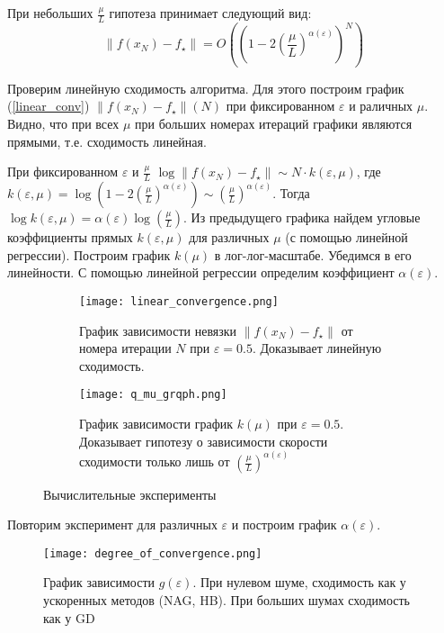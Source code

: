 \documentclass{article}
\begin{document}
При небольших $\frac{\mu}{L}$ гипотеза принимает следующий вид:
\begin{equation}\label{NoisyGFOMconverge}
   \|f(x_N) - f_{\star}\| = O\left(\left(1 - 2\left(\frac{\mu}{L}\right)^{\alpha(\varepsilon)}\right)^N\right) 
\end{equation}

Проверим линейную сходимость алгоритма. Для этого построим график (\ref{linear_conv}) $\|f(x_N) - f_{\star}\|(N)$ при фиксированном $\varepsilon$ и раличных $\mu$. Видно, что при всех $\mu$ при больших номерах итераций графики являются прямыми, т.е. сходимость линейная.

При фиксированном $\varepsilon$ и $\frac{\mu}{L}$ $\log{\|f(x_N) - f_{\star}\| \sim N \cdot k(\varepsilon, \mu)}$, где $k(\varepsilon, \mu) = \log{\left(1 - 2\left(\frac{\mu}{L}\right)^{\alpha(\varepsilon)}\right)}\sim \left(\frac{\mu}{L}\right)^{\alpha(\varepsilon)}$.
Тогда $\log{k(\varepsilon, \mu)} = \alpha(\varepsilon) \log{\left(\frac{\mu}{L}\right)}$. Из предыдущего графика найдем угловые коэффициенты прямых $k(\varepsilon, \mu)$ для различных $\mu$ (с помощью линейной регрессии). Построим график $k(\mu)$ в лог-лог-масштабе. Убедимся в его линейности. С помощью линейной регрессии определим коэффициент $\alpha(\varepsilon)$. 
\begin{figure}[htp]
     \centering
     \begin{subfigure}[b]{0.45\textwidth}
         \centering
         \texttt{[image: linear\_convergence.png]}
         \caption{График зависимости невязки $\|f(x_N) - f_{\star}\|$ от номера итерации $N$ при $\varepsilon = 0.5$. Доказывает линейную сходимость.}
         \label{fig:linear_conv}
     \end{subfigure}
     \hfill
     \begin{subfigure}[b]{0.45\textwidth}
         \centering
         \texttt{[image: q\_mu\_grqph.png]}
         \caption{График зависимости график $k(\mu)$ при $\varepsilon = 0.5$. Доказывает гипотезу о зависимости скорости сходимости только лишь от $\left(\frac{\mu}{L}\right)^{\alpha(\varepsilon)}$}
         \label{fig:three sin x}
     \end{subfigure}
     \hfill
        \caption{Вычислительные эксперименты}
        \label{fig:two graphs}
\end{figure}


Повторим эксперимент для различных $\varepsilon$ и построим график $\alpha(\varepsilon)$.
\begin{figure}
\centering
\texttt{[image: degree\_of\_convergence.png]}
    \caption{График зависимости $g(\varepsilon)$. При нулевом шуме, сходимость как у ускоренных методов (NAG, HB). При больших шумах сходимость как у GD}
\end{figure}
\end{document}

